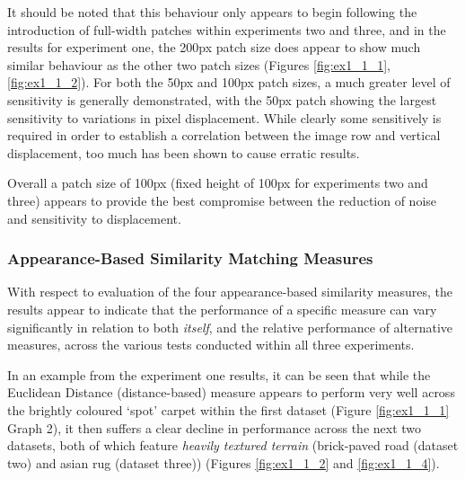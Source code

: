 It should be noted that this behaviour only appears to begin following the introduction of full-width patches within experiments two and three, and in the results for experiment one, the 200px patch size does appear to show much similar behaviour as the other two patch sizes (Figures \ref{fig:ex1_1_1}, \ref{fig:ex1_1_2}). For both the 50px and 100px patch sizes, a much greater level of sensitivity is generally demonstrated, with the 50px patch showing the largest sensitivity to variations in pixel displacement. While clearly some sensitively is required in order to establish a correlation between the image row and vertical displacement, too much has been shown to cause erratic results.

Overall a patch size of 100px (fixed height of 100px for experiments two and three) appears to provide the best compromise between the reduction of noise and sensitivity to displacement.

\subsubsection{Appearance-Based Similarity Matching Measures}

With respect to evaluation of the four appearance-based similarity measures, the results appear to indicate that the performance of a specific measure can vary significantly in relation to both \textit{itself}, and the relative performance of alternative measures, across the various tests conducted within all three experiments. 

In an example from the experiment one results, it can be seen that while the Euclidean Distance (distance-based) measure appears to perform very well across the brightly coloured `spot' carpet within the first dataset (Figure \ref{fig:ex1_1_1} Graph 2), it then suffers a clear decline in performance across the next two datasets, both of which feature \textit{heavily textured terrain} (brick-paved road (dataset two) and asian rug (dataset three)) (Figures \ref{fig:ex1_1_2} and \ref{fig:ex1_1_4}). 

